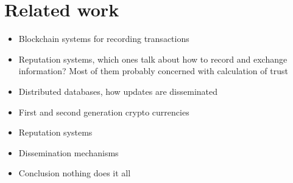 \section{Related work}

\begin{itemize}
    \item Blockchain systems for recording transactions
    \item Reputation systems, which ones talk about how to record and exchange information? Most of them probably concerned with calculation of trust
    \item Distributed databases, how updates are disseminated
\end{itemize}

{\color{red}
\begin{itemize}
    \item First and second generation crypto currencies
    \item Reputation systems
    \item Dissemination mechanisms
    \item Conclusion nothing does it all
\end{itemize}}



